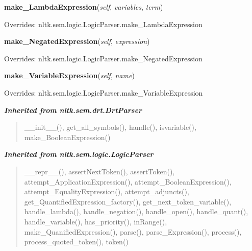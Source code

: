 \hspace{.8\funcindent}\begin{boxedminipage}{\funcwidth}

    \raggedright \textbf{make\_LambdaExpression}(\textit{self}, \textit{variables}, \textit{term})

\setlength{\parskip}{2ex}
\setlength{\parskip}{1ex}
      Overrides: nltk.sem.logic.LogicParser.make\_LambdaExpression

    \end{boxedminipage}

    \vspace{0.5ex}

\hspace{.8\funcindent}\begin{boxedminipage}{\funcwidth}

    \raggedright \textbf{make\_NegatedExpression}(\textit{self}, \textit{expression})

\setlength{\parskip}{2ex}
\setlength{\parskip}{1ex}
      Overrides: nltk.sem.logic.LogicParser.make\_NegatedExpression

    \end{boxedminipage}

    \vspace{0.5ex}

\hspace{.8\funcindent}\begin{boxedminipage}{\funcwidth}

    \raggedright \textbf{make\_VariableExpression}(\textit{self}, \textit{name})

\setlength{\parskip}{2ex}
\setlength{\parskip}{1ex}
      Overrides: nltk.sem.logic.LogicParser.make\_VariableExpression

    \end{boxedminipage}


\large{\textbf{\textit{Inherited from nltk.sem.drt.DrtParser}}}

\begin{quote}
\_\_init\_\_(), get\_all\_symbols(), handle(), isvariable(), make\_BooleanExpression()
\end{quote}

\large{\textbf{\textit{Inherited from nltk.sem.logic.LogicParser}}}

\begin{quote}
\_\_repr\_\_(), assertNextToken(), assertToken(), attempt\_ApplicationExpression(), attempt\_BooleanExpression(), attempt\_EqualityExpression(), attempt\_adjuncts(), get\_QuantifiedExpression\_factory(), get\_next\_token\_variable(), handle\_lambda(), handle\_negation(), handle\_open(), handle\_quant(), handle\_variable(), has\_priority(), inRange(), make\_QuanifiedExpression(), parse(), parse\_Expression(), process(), process\_quoted\_token(), token()
\end{quote}

